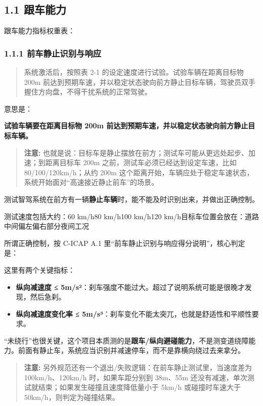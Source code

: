 \subsection{1.1 跟车能力}

跟车能力指标权重表：

\subsubsection{1.1.1 前车静止识别与响应}

\begin{quote}
  系统激活后，按照表 2-1 的设定速度进行试验。试验车辆在距离目标物 200m 前达到预期车速，并以稳定状态驶向前方静止目标车辆，驾驶员双手握住方向盘，不得干扰系统的正常驾驶。
\end{quote}

意思是：

\textbf{试验车辆要在距离目标物 200m 前达到预期车速，并以稳定状态驶向前方静止目标车辆。}

\begin{quote}
  \textbf{注意:} 也就是说：目标车是静止摆放在前方；测试车可能从更远处起步、加速；到距离目标车 200m 之前，测试车必须已经达到设定车速，比如 80/100/120km/h；从约 200m 这个距离开始，车辆应处于稳定车速状态，系统开始面对“高速接近静止前车”的场景。
\end{quote}

测试智驾系统在前方有一辆\textbf{静止车辆}时，能不能及时识别出来，并做出正确控制。

测试速度包括大约：60 km/h80 km/h100 km/h120 km/h目标车位置会放在：道路中间偏左偏右部分夜间工况

所谓正确控制，按 C-ICAP A.1 里“前车静止识别与响应得分说明”，核心判定是：

这里有两个关键指标：

\begin{itemize}
  \item \textbf{纵向减速度 ≤ 5m/s²}：刹车强度不能过大。超过了说明系统可能是很晚才发现，然后急刹。
  \item \textbf{纵向减速度变化率 ≤ 5m/s³}：刹车变化不能太突兀，也就是舒适性和平顺性要求。
\end{itemize}

“未绕行”也很关键，这个项目本质测的是\textbf{跟车/纵向避碰能力}，不是测变道绕障能力。前面有静止车，系统应当识别并减速停车，而不是靠横向绕过去来拿分。

\begin{quote}
  \textbf{注意:} 另外规范还有一个退出/失败逻辑：在前车静止测试里，当速度差为 100km/h、120km/h 时，如果车距分别到 38m、55m 还没有减速，单次测试就结束；如果发生碰撞且速度降低量小于 5km/h 或碰撞时车速大于 50km/h，则判定为碰撞结果。
\end{quote}

